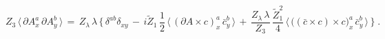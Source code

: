 \begin{equation}
  \label{glSTIs}
 {Z_3} \,  \langle \,
      \partial A^a_x \, \partial A^b_y \, \rangle  \,=\, {Z_\lambda \, \lambda} \,
\Big\{ \, \delta^{ab} \delta_{xy}   \, - \, i \widetilde Z_1 \, \frac{1}{2}
 \, \langle \, (\partial A \times  c)^a_x \, \bar c^b_y \, \rangle \, + \,
             \frac{Z_\lambda \, \lambda}{ Z_3}
      \,  \frac{{\widetilde Z}_1^2 }{4}  \,
  \langle \, \big( (\bar c \times  c ) \times c \big)^a_x \, \bar c^b_y \,
                      \rangle \, \Big\}  \; .
\end{equation}

